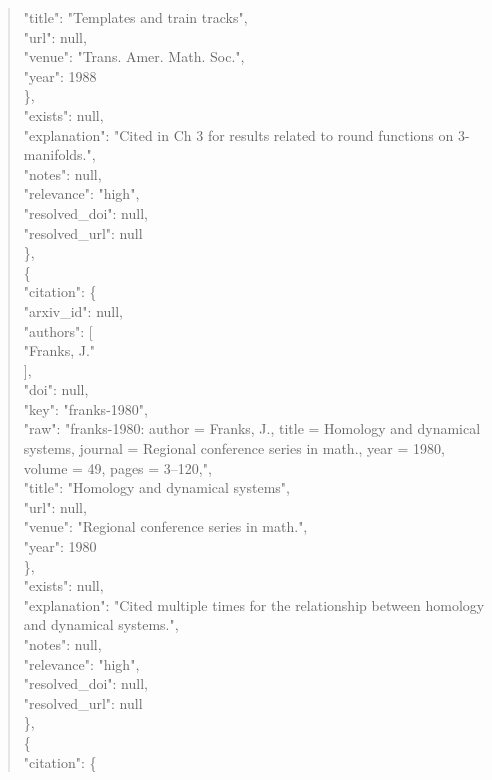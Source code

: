 \documentclass[11pt]{article}
\begin{document}
\begin{quote}
        "title": "Templates and train tracks",\\
        "url": null,\\
        "venue": "Trans. Amer. Math. Soc.",\\
        "year": 1988\\
      \},\\
      "exists": null,\\
      "explanation": "Cited in Ch 3 for results related to round functions on 3-manifolds.",\\
      "notes": null,\\
      "relevance": "high",\\
      "resolved\_doi": null,\\
      "resolved\_url": null\\
    \},\\
    \{\\
      "citation": \{\\
        "arxiv\_id": null,\\
        "authors": [\\
          "Franks, J."\\
        ],\\
        "doi": null,\\
        "key": "franks-1980",\\
        "raw": "franks-1980: author = Franks, J., title = Homology and dynamical systems, journal = Regional conference series in math., year = 1980, volume = 49, pages = 3--120,",\\
        "title": "Homology and dynamical systems",\\
        "url": null,\\
        "venue": "Regional conference series in math.",\\
        "year": 1980\\
      \},\\
      "exists": null,\\
      "explanation": "Cited multiple times for the relationship between homology and dynamical systems.",\\
      "notes": null,\\
      "relevance": "high",\\
      "resolved\_doi": null,\\
      "resolved\_url": null\\
    \},\\
    \{\\
      "citation": \{\\

\end{quote}
\end{document}
